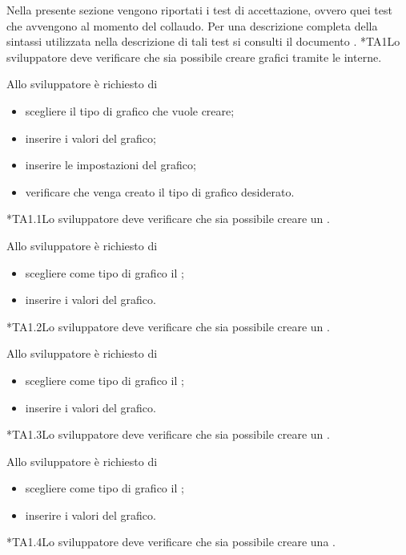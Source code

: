 	Nella presente sezione vengono riportati i test di accettazione, ovvero quei test che avvengono al momento del collaudo. Per una descrizione completa della sintassi utilizzata nella descrizione di tali test si consulti il documento .
	*{TA1}Lo sviluppatore deve verificare che sia possibile creare grafici tramite le  interne.
	 
		Allo sviluppatore è richiesto di
		\begin{itemize}
			\item scegliere il tipo di grafico che vuole creare;
			\item inserire i valori del grafico;
			\item inserire le impostazioni del grafico;
			\item verificare che venga creato il tipo di grafico desiderato.
		\end{itemize}

	*{TA1.1}Lo sviluppatore deve verificare che sia possibile creare un .

		Allo sviluppatore è richiesto di
		\begin{itemize}
			\item scegliere come tipo di grafico il ;
			\item inserire i valori del grafico.
		\end{itemize}

	*{TA1.2}Lo sviluppatore deve verificare che sia possibile creare un .

		Allo sviluppatore è richiesto di
		\begin{itemize}
			\item scegliere come tipo di grafico il ;
			\item inserire i valori del grafico.
		\end{itemize}

	*{TA1.3}Lo sviluppatore deve verificare che sia possibile creare un .

		Allo sviluppatore è richiesto di
		\begin{itemize}
			\item scegliere come tipo di grafico il ;
			\item inserire i valori del grafico.
		\end{itemize}

	*{TA1.4}Lo sviluppatore deve verificare che sia possibile creare una .

